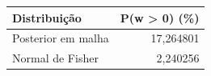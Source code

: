 \begin{tabular}{lr}
\toprule
Distribuição & P(w > 0) (\%) \\
\midrule
Posterior em malha & 17,264801 \\
Normal de Fisher & 2,240256 \\
\bottomrule
\end{tabular}
